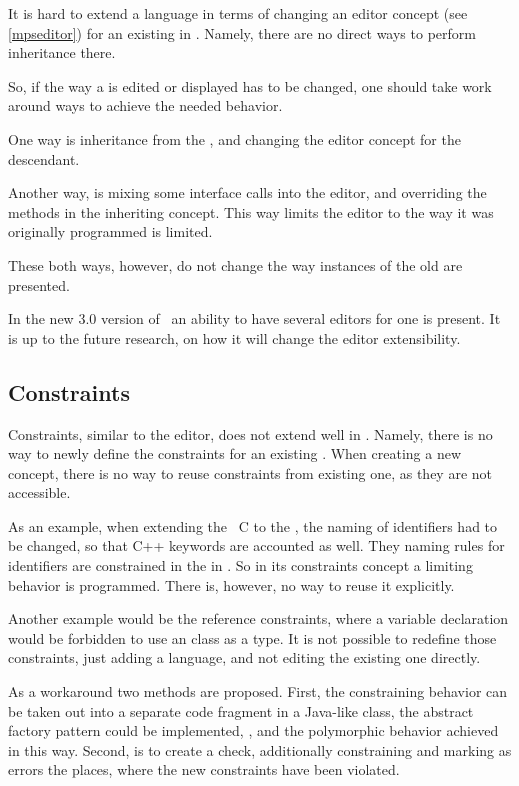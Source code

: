 It is hard to extend a language in terms of changing an editor concept (see \ref{mpseditor}) for an existing  in \jbmps.
Namely, there are no direct ways to perform inheritance there. 

So, if the way a  is edited or displayed has to be 
changed, one should take work around ways to achieve the needed behavior. 

One way is inheritance from the , and changing the editor concept for the descendant.

Another way, is mixing some interface calls into the editor, and overriding the methods in the inheriting concept.
This way limits the editor to the way it was originally programmed is limited.

These both ways, however, do not change the way instances of the old  are presented.

In the new 3.0 version of \jbmps\ an ability to have several editors for one  is present. It is 
up to the future research, on how it will change the editor extensibility.

\subsection{Constraints}

Constraints, similar to the editor, does not extend well in \jbmps. Namely, there is no way to newly define the constraints
for an existing . When creating a new concept, there is no way to reuse constraints from existing one, as they 
are not accessible.

As an example, when extending the \mbdr\ C to the \pcpp, the naming of identifiers had to be changed, so that C++ keywords
are accounted as well. They naming rules for identifiers are constrained in the  in \mbdr.
So in its constraints concept a limiting behavior is programmed. There is, however, no way to reuse it explicitly.

Another example would be the reference constraints, where a variable declaration would be forbidden to use an  class
as a type. It is not possible to redefine those constraints, just adding a language, and not editing the existing one directly.

As a workaround two methods are proposed. First, the constraining behavior can be taken out into a separate code fragment in a Java-like class,
the abstract factory pattern could be implemented, \cite{GOF95}, and the polymorphic behavior achieved in this way.  Second, is to 
create a check, additionally constraining and marking as errors the places, where the new constraints have been violated.

